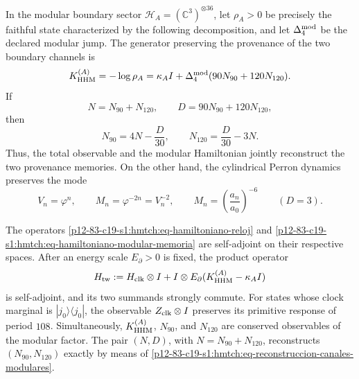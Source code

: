 In the modular boundary sector
\(\mathcal H_A=(\mathbb C^3)^{\otimes36}\), let \(\rho_A>0\) be precisely
the faithful state characterized by the following decomposition, and let
\(\Delta_4^{\rm mod}\) be the declared modular jump. The generator preserving
the provenance of the two boundary channels is
\begin{equation}
 K_{\rm HHM}^{(A)}=-\log\rho_A
 =\kappa_A I+\Delta_4^{\rm mod}(90N_{90}+120N_{120}).
 \label{p12-83-c19-s1:hmtch:eq-hamiltoniano-modular-memoria}
\end{equation}
If
\[
 N=N_{90}+N_{120},
 \qquad
 D=90N_{90}+120N_{120},
\]
then
\begin{equation}
 N_{90}=4N-\frac{D}{30},
 \qquad
 N_{120}=\frac{D}{30}-3N.
 \label{p12-83-c19-s1:hmtch:eq-reconstruccion-canales-modulares}
\end{equation}
Thus, the total observable and the modular Hamiltonian jointly reconstruct
the two provenance memories. On the other hand, the cylindrical Perron
dynamics preserves the mode
\begin{equation}
 V_n=\varphi^n,
 \qquad
 M_n=\varphi^{-2n}=V_n^{-2},
 \qquad
 M_n=\left(\frac{a_n}{a_0}\right)^{-6}\qquad(D=3).
 \label{p12-83-c19-s1:hmtch:eq-modo-estable-memoria}
\end{equation}

\begin{theorem}
\label{p12-83-c19-s1:hmtch:thm-composicion-calendario-memoria}
The operators
\eqref{p12-83-c19-s1:hmtch:eq-hamiltoniano-reloj} and
\eqref{p12-83-c19-s1:hmtch:eq-hamiltoniano-modular-memoria} are self-adjoint on their
respective spaces. After an energy scale \(E_\partial>0\) is fixed, the
product operator
\begin{equation}
 H_{\rm tw}
 :=H_{\rm clk}\otimes I
 +I\otimes E_\partial(K_{\rm HHM}^{(A)}-\kappa_A I)
 \label{p12-83-c19-s1:hmtch:eq-hamiltoniano-two-way-total}
\end{equation}
is self-adjoint, and its two summands strongly commute. For states whose
clock marginal is \(|j_0\rangle\langle j_0|\), the observable
\(Z_{\rm clk}\otimes I\) preserves its primitive response of period \(108\).
Simultaneously, \(K_{\rm HHM}^{(A)}\), \(N_{90}\), and \(N_{120}\) are
conserved observables of the modular factor. The pair \((N,D)\), with
\(N=N_{90}+N_{120}\), reconstructs \((N_{90},N_{120})\) exactly by means of
\eqref{p12-83-c19-s1:hmtch:eq-reconstruccion-canales-modulares}.
\end{theorem}

